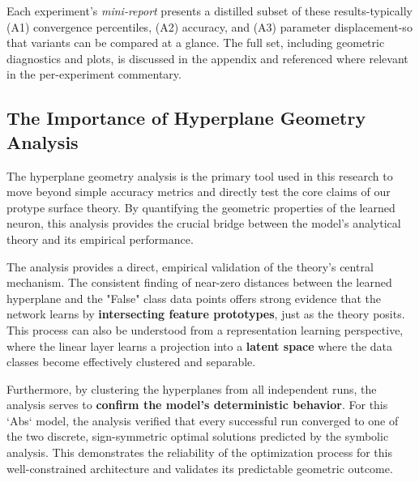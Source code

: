 Each experiment's \emph{mini-report} presents a distilled subset of these results-typically (A1) convergence percentiles, (A2) accuracy, and (A3) parameter displacement-so that variants can be compared at a glance.  The full set, including geometric diagnostics and plots, is discussed in the appendix and referenced where relevant in the per-experiment commentary.

\subsection*{The Importance of Hyperplane Geometry Analysis}
\label{sec:analysis-importance-abs1}

The hyperplane geometry analysis is the primary tool used in this research to move beyond simple accuracy metrics and directly test the core claims of our protype surface theory. By quantifying the geometric properties of the learned neuron, this analysis provides the crucial bridge between the model's analytical theory and its empirical performance.

The analysis provides a direct, empirical validation of the theory's central mechanism. The consistent finding of near-zero distances between the learned hyperplane and the "False" class data points offers strong evidence that the network learns by \textbf{intersecting feature prototypes}, just as the theory posits. This process can also be understood from a representation learning perspective, where the linear layer learns a projection into a \textbf{latent space} where the data classes become effectively clustered and separable.

Furthermore, by clustering the hyperplanes from all independent runs, the analysis serves to \textbf{confirm the model's deterministic behavior}. For this `Abs` model, the analysis verified that every successful run converged to one of the two discrete, sign-symmetric optimal solutions predicted by the symbolic analysis. This demonstrates the reliability of the optimization process for this well-constrained architecture and validates its predictable geometric outcome.